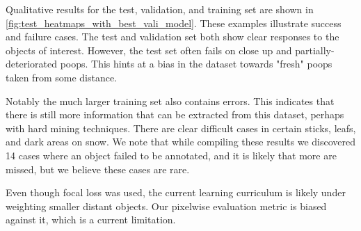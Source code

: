 \documentclass[10pt,twocolumn,letterpaper]{article}
\begin{document}
Qualitative results for the test, validation, and training set are shown in
\cref{fig:test_heatmaps_with_best_vali_model}. These examples illustrate
success and failure cases. The test and validation set both show clear
responses to the objects of interest. However, the test set often fails on
close up and partially-deteriorated poops. This hints at a bias in the dataset
towards "fresh" poops taken from some distance.

Notably the much larger training set also contains errors. This indicates that
there is still more information that can be extracted from this dataset,
perhaps with hard mining techniques. There are clear difficult cases in certain
sticks, leafs, and dark areas on snow. We note that while compiling these
results we discovered 14 cases where an object failed to be annotated, and it
is likely that more are missed, but we believe these cases are rare.





Even though focal loss was used, the current learning curriculum is likely
under weighting smaller distant objects. Our pixelwise evaluation metric is
biased against it, which is a current limitation.
\end{document}
